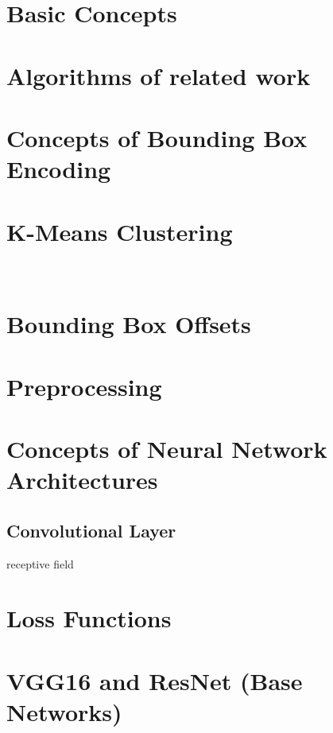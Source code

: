 \appendix

\section{Basic Concepts}
\blindtext[1]

\section{Algorithms of related work}
\blindtext[2]

\section{Concepts of Bounding Box Encoding}\label{append:Concepts of Bounding Box Encoding}
\blindtext[3]



\section{K-Means Clustering}\label{append:K-Means Clustering}
\blindtext[3]~\cite[386-390]{James.2017}
\section{Bounding Box Offsets}
\blindtext[1]

\section{Preprocessing}
\blindtext[3]

\section{Concepts of Neural Network Architectures}
\blindtext[3]
\subsection{Convolutional Layer}\label{append:Convolutional Layer}
receptive field~\cite[335-345]{IanGoodfellow.2016}
\blindtext[1]
\blindtext[3]

\section{Loss Functions}
\blindtext[2]

\section{VGG16 and ResNet (Base Networks)}
\blindtext[3]


